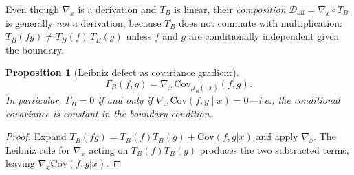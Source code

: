 \documentclass[11pt,a4paper]{article}
\theoremstyle{plain}
\newtheorem{proposition}[theorem]{Proposition}
\theoremstyle{definition}
\theoremstyle{remark}
\newcommand{\Cov}{\mathrm{Cov}}
\begin{document}
Even though $\nabla_x$ is a derivation and $T_B$ is linear,
their \emph{composition} $\mathcal{D}_{\mathrm{eff}} = \nabla_x \circ T_B$
is generally \emph{not} a derivation, because $T_B$ does not
commute with multiplication:
$T_B(fg) \neq T_B(f)\,T_B(g)$ unless $f$ and $g$ are conditionally
independent given the boundary.

\begin{proposition}[Leibniz defect as covariance gradient]\label{prop:leibniz-cov}
\begin{equation}
\Gamma_B(f,g) = \nabla_x\,\Cov_{\mu_B(\cdot|x)}(f, g).
\end{equation}
In particular, $\Gamma_B = 0$ if and only if
$\nabla_x\,\Cov(f,g \mid x) = 0$---i.e., the conditional covariance
is constant in the boundary condition.
\end{proposition}

\begin{proof}
Expand $T_B(fg) = T_B(f)T_B(g) + \Cov(f,g|x)$ and apply $\nabla_x$.
The Leibniz rule for $\nabla_x$ acting on
$T_B(f)T_B(g)$ produces the two subtracted terms, leaving
$\nabla_x\Cov(f,g|x)$.
\end{proof}
\end{document}
